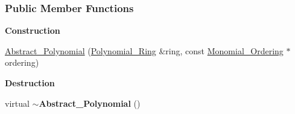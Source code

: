\subsubsection*{Public Member Functions}
\begin{Indent}\textbf{ Construction}\par
\begin{DoxyCompactItemize}
\item 
\hyperlink{group__polygroup_af72cda5555005f99c9844fece4e5ca46}{Abstract\+\_\+\+Polynomial} (\hyperlink{group__polygroup_class_polynomial___ring}{Polynomial\+\_\+\+Ring} \&ring, const \hyperlink{group__orderinggroup_class_monomial___ordering}{Monomial\+\_\+\+Ordering} $\ast$ordering)
\end{DoxyCompactItemize}
\end{Indent}
\begin{Indent}\textbf{ Destruction}\par
\begin{DoxyCompactItemize}
\item 
\mbox{\label{group__polygroup_a5082a214ab62d3d5aad6d294926be8e2}} 
virtual {\bfseries $\sim$\+Abstract\+\_\+\+Polynomial} ()
\end{DoxyCompactItemize}
\end{Indent}
